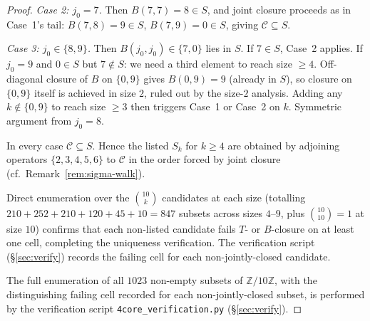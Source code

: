 \documentclass[11pt,reqno]{amsart}
\theoremstyle{plain}
\theoremstyle{definition}
\theoremstyle{remark}
\newcommand{\Z}{\mathbb{Z}}
\newcommand{\Zten}{\Z/10\Z}
\newcommand{\Cfour}{\mathcal{C}}
\begin{document}
\begin{proof}
\emph{Case 2: $j_{0} = 7$.} Then $B(7,7) = 8 \in S$, and joint
closure proceeds as in Case~1's tail: $B(7,8) = 9 \in S$,
$B(7,9) = 0 \in S$, giving $\Cfour \subseteq S$.

\emph{Case 3: $j_{0} \in \{8, 9\}$.} Then $B(j_{0}, j_{0}) \in
\{7, 0\}$ lies in $S$. If $7 \in S$, Case~2 applies. If
$j_{0} = 9$ and $0 \in S$ but $7 \notin S$: we need a third
element to reach size $\geq 4$. Off-diagonal closure of $B$ on
$\{0, 9\}$ gives $B(0, 9) = 9$ (already in $S$), so closure on
$\{0, 9\}$ itself is achieved in size $2$, ruled out by the
size-$2$ analysis. Adding any $k \notin \{0, 9\}$ to reach size
$\geq 3$ then triggers Case~1 or Case~2 on $k$. Symmetric
argument from $j_{0} = 8$.

In every case $\Cfour \subseteq S$. Hence the listed $S_{k}$ for
$k \geq 4$ are obtained by adjoining operators
$\{2, 3, 4, 5, 6\}$ to $\Cfour$ in the order forced by joint
closure (cf.\ Remark~\ref{rem:sigma-walk}).

Direct enumeration over the $\binom{10}{k}$ candidates at each
size (totalling $210+252+210+120+45+10=847$ subsets across sizes
$4$–$9$, plus $\binom{10}{10}=1$ at size $10$) confirms that each
non-listed candidate fails $T$- or $B$-closure on at least one
cell, completing the uniqueness verification. The verification
script (\S\ref{sec:verify}) records the failing cell for each
non-jointly-closed candidate.

The full enumeration of all $1023$ non-empty subsets of $\Zten$,
with the distinguishing failing cell recorded for each
non-jointly-closed subset, is performed by the verification
script \texttt{4core\_verification.py} (\S\ref{sec:verify}).
\end{proof}
\end{document}
